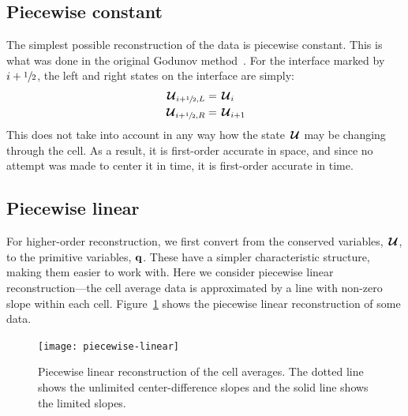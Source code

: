 \subsection{Piecewise constant}

The simplest possible reconstruction of the data is piecewise constant.
This is what was done in the original Godunov method~\cite{godunov:1959}.  For the interface
marked by $i+{\sfrac{1}{2}}$, the left and right states on the interface are simply:
\begin{align}
{\,\boldsymbol{\mathcal{U}}}_{i+{\sfrac{1}{2}},L} &= {\,\boldsymbol{\mathcal{U}}}_i \\
{\,\boldsymbol{\mathcal{U}}}_{i+{\sfrac{1}{2}},R} &= {\,\boldsymbol{\mathcal{U}}}_{i+1}
\end{align}
This does not take into account in any way how the state ${\,\boldsymbol{\mathcal{U}}}$ may be changing
through the cell.  As a result, it is first-order accurate in space, and since
no attempt was made to center it in time, it is first-order accurate in time.

\subsection{Piecewise linear}

For higher-order reconstruction, we first convert from the conserved
variables, ${\,\boldsymbol{\mathcal{U}}}$, to the primitive variables, ${\bf q}$.  These have a simpler
characteristic structure, making them easier to work with.  Here we
consider piecewise linear reconstruction---the cell average data is
approximated by a line with non-zero slope within each cell.
Figure~\ref{fig:plm} shows the piecewise linear reconstruction of some
data.


\begin{figure}[t]
\centering
\texttt{[image: piecewise-linear]}
\caption[Piecewise linear reconstruction of cell average
  data]{\label{fig:plm} Piecewise linear reconstruction of the cell
  averages.  The dotted line shows the unlimited center-difference
  slopes and the solid line shows the limited slopes.}
\end{figure}

